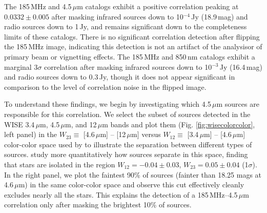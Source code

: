 \documentclass[numberedappendix]{emulateapj}
\providecommand{\DIFadd}[1]{{\protect\color{blue}\uwave{#1}}} %
\providecommand{\DIFaddbegin}{} %
\providecommand{\DIFaddend}{} %
\begin{document}
The 185\,MHz and 4.5\,$\mu$m catalogs exhibit a positive correlation peaking at $0.0332\pm0.005$ after masking infrared sources down to 10$^{-4}$\,Jy (18.9\,mag) and radio sources down to 1\,Jy, and remains significant down to the completeness limits of these catalogs. There is no significant correlation detection after flipping the 185\,MHz image, indicating this detection is not an artifact of the analysis\DIFaddbegin \DIFadd{, }\DIFaddend or of primary beam or vignetting effects. The 185\,MHz and 850\,nm catalogs exhibit a marginal $3\sigma$ correlation after masking infrared sources down to 10$^{-3}$\,Jy (16.4\,mag) and radio sources down to 0.3\,Jy, though it does not appear significant in comparison to the level of correlation noise in the flipped image.

To understand these findings, we begin by investigating which 4.5\,$\mu$m sources are responsible for this correlation. We select the subset of sources detected in the WISE 3.4\,$\mu$m, 4.5\,$\mu$m, and 12\,$\mu$m bands and plot them (Fig. \ref{fig:wisecolorcolor}, left panel) in the $W_{23}\equiv$ [4.6\,$\mu$m] -- [12\,$\mu$m] versus $W_{12}\equiv$ [3.4\,$\mu$m] -- [4.6\,$\mu$m] color-color space used by \citet{Wright2010} to illustrate the separation between different types of sources. \citet{nikutta14} study more quantitatively how sources separate in this space, finding that stars are isolated in the region $W_{12}=-0.04\pm0.03$, $W_{23}=0.05\pm0.04$ (1$\sigma$). In the right panel, we plot the faintest 90\% of sources (fainter than 18.25 mags at 4.6\,$\mu$m) in the same color-color space and observe this cut effectively cleanly excludes nearly all the stars. This explains the detection of a 185\,MHz--4.5\,$\mu$m correlation only after masking the brightest 10\% of sources. 
\end{document}
